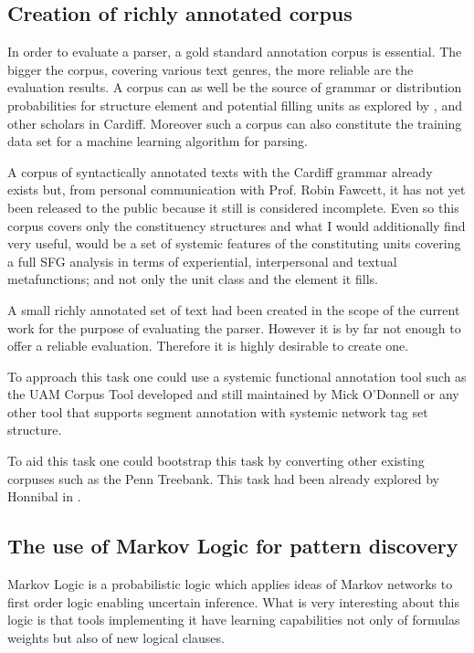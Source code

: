 \subsection{Creation of richly annotated corpus}
    In order to evaluate a parser, a gold standard annotation corpus is essential.  The bigger the corpus, covering various text genres, the more reliable are the evaluation results. A corpus can as well be the source of grammar or distribution probabilities for structure element and potential filling units as explored by \citet{Day2007}, \citet{Souter1996} and other scholars in Cardiff. Moreover such a corpus can also constitute the training data set for a machine learning algorithm for parsing.

    A corpus of syntactically annotated texts with the Cardiff grammar already exists but, from personal communication with Prof. Robin Fawcett, it has not yet been released to the public because it still is considered incomplete. Even so this corpus covers only the constituency structures and what I would additionally find very useful, would be a set of systemic features of the constituting units covering a full SFG analysis in terms of experiential, interpersonal and textual metafunctions; and not only the unit class and the element it fills.

    A small richly annotated set of text had been created in the scope of the current work for the purpose of evaluating the parser. However it is by far not enough to offer a reliable evaluation. Therefore it is highly desirable to create one. 

    To approach this task one could use a systemic functional annotation tool such as the UAM Corpus Tool \citep{ODonnell2008,ODonnell2008a} developed and still maintained by Mick O'Donnell or any other tool that supports segment annotation with systemic network tag set structure.

    To aid this task one could bootstrap this task by converting other existing corpuses such as the Penn Treebank. This task had been already explored by Honnibal in \citeyear{Honnibal2004a,Honnibal2007}.

\subsection{The use of Markov Logic for pattern discovery}
    Markov Logic \citep{Richardson2006,Domingos2010} is a probabilistic logic which applies ideas of Markov networks to first order logic enabling uncertain inference. What is very interesting about this logic is that tools implementing it have learning capabilities not only of formulas weights but also of new logical clauses. 

